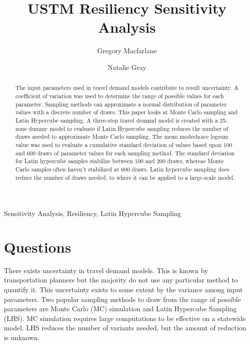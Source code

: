 \documentclass[3p, authoryear, review]{elsarticle} %
\begin{document}
\begin{frontmatter}

  \title{USTM Resiliency Sensitivity Analysis}
    \author[Brigham Young University]{Gregory Macfarlane}
    \author[Brigham Young University]{Natalie Gray}
      \address[Brigham Young University]{Civil and Environmental Engineering Department, 430 Engineering Building, Provo, Utah 84602}
  
  \begin{abstract}
  The input parameters used in travel demand models contribute to result uncertainty. A coefficient of variation was used to determine the range of possible values for each parameter. Sampling methods can approximate a normal distribution of parameter values with a discrete number of draws. This paper looks at Monte Carlo sampling and Latin Hypercube sampling. A three-step travel demand model is created with a 25-zone dummy model to evaluate if Latin Hypercube sampling reduces the number of draws needed to approximate Monte Carlo sampling. The mean modechoice logsum value was used to evaluate a cumulative standard deviation of values based upon 100 and 600 draws of parameter values for each sampling method. The standard deviation for Latin hypercube samples stabilize between 100 and 200 draws, whereas Monte Carlo samples often haven't stabilized at 600 draws. Latin hypercube sampling does reduce the number of draws needed, to where it can be applied to a large-scale model.
  \end{abstract}
   \begin{keyword} Sensitivity Analysis, Resiliency, Latin Hypercube Sampling\end{keyword}
 \end{frontmatter}

\hypertarget{questions}{%
\section{Questions}\label{questions}}

There exists uncertainty in travel demand models. This is known by transportation planners but the majority do not use any particular method to quantify it. This uncertainty exists to some extent by the variance among input parameters. Two popular sampling methods to draw from the range of possible parameters are Monte Carlo (MC) simulation and Latin Hypercube Sampling (LHS). MC simulation requires large computations to be effective on a statewide model. LHS reduces the number of variants needed, but the amount of reduction is unknown. \citep{yang2013sensitivity}
\end{document}
